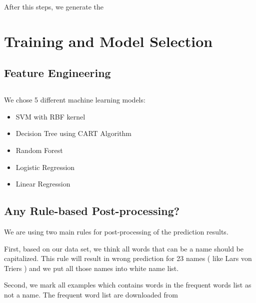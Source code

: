 \documentclass{article}
\begin{document}
After this steps, we generate the 

\section{Training and Model Selection}

\subsection{ Feature Engineering}

\subsection{}
We chose 5 different machine learning models:

\begin{itemize}
\setlength\itemsep{0.01em}
\item SVM with RBF kernel
\item Decision Tree using CART Algorithm
\item Random Forest
\item Logistic Regression
\item Linear Regression
\end{itemize}

\subsection{}

\subsection{Any Rule-based Post-processing?}

We are using two main rules for post-processing of the prediction results. 

First, based on our data set, we think all words that can be a name should be capitalized.  This rule will result in wrong prediction for 23 names ( like Lars von Triers  ) and we put all those names into white name list.

Second, we mark all examples which contains words in the frequent words list as not a name. The frequent word list are downloaded from 

\end{document}
